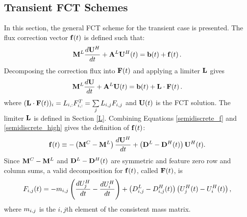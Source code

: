 \subsection{Transient FCT Schemes}
In this section, the general FCT scheme for the transient case is presented.
The flux correction vector $\mathbf{f}(t)$ is defined such that:
\begin{equation}\label{semidiscrete_f}
   \mathbf{M}^L\frac{d\mathbf{U}^{H}}{dt} + \mathbf{A}^L\mathbf{U}^H(t) = \mathbf{b}(t) + \mathbf{f}(t) \,.
\end{equation}
Decomposing the correction flux into $\mathbf{F}(t)$ and applying a limiter $\mathbf{L}$ gives
\begin{equation}\label{semidiscrete_limited}
   \mathbf{M}^L\frac{d\mathbf{U}}{dt} + \mathbf{A}^L\mathbf{U}(t) = \mathbf{b}(t) + \mathbf{L}\cdot\mathbf{F}(t) \,.
\end{equation}
where $(\mathbf{L}\cdot\mathbf{F}(t))_i = L_{i,:}F_{i,:}^T = \sum\limits_j L_{i,j} F_{i,j}$
and $\mathbf{U}(t)$ is the FCT solution. The limiter $\mathbf{L}$ is
defined in Section \ref{L}.
%
Combining Equations \eqref{semidiscrete_f} and \eqref{semidiscrete_high}
gives the definition of $\mathbf{f}(t)$:
\begin{equation}\label{gtf}
   \mathbf{f}(t) \equiv -\left(\mathbf{M}^C-\mathbf{M}^L\right)\frac{d\mathbf{U}^H}{dt} + \left(\mathbf{D}^L-\mathbf{D}^H(t)\right)\mathbf{U}^H(t).
\end{equation}
Since $\mathbf{M}^C-\mathbf{M}^L$ and $\mathbf{D}^L-\mathbf{D}^H(t)$ are symmetric
and feature zero row and column sums, a valid decomposition for $\mathbf{f}(t)$,
called $\mathbf{F}(t)$, is
\begin{equation}
   F_{i,j}(t) = -m_{i,j}\left(\frac{dU_j^H}{dt} - \frac{dU_i^H}{dt}\right)
   + \left(D_{i,j}^L-D_{i,j}^H(t)\right)\left(U_j^H(t) - U_i^H(t)\right),
\end{equation}
where $m_{i,j}$ is the $i,j$th element of the consistent mass matrix.
